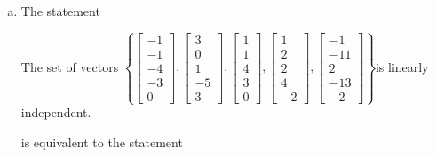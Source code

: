\begin{exerciseAnswer}
\begin{enumerate}[(a)]
\item The statement 
\begin{center}\begin{minipage}{0.8\textwidth}
 The set of vectors \( \left\{ \left[\begin{array}{c}
-1 \\
-1 \\
-4 \\
-3 \\
0
\end{array}\right] , \left[\begin{array}{c}
3 \\
0 \\
1 \\
-5 \\
3
\end{array}\right] , \left[\begin{array}{c}
1 \\
1 \\
4 \\
3 \\
0
\end{array}\right] , \left[\begin{array}{c}
1 \\
2 \\
2 \\
4 \\
-2
\end{array}\right] , \left[\begin{array}{c}
-1 \\
-11 \\
2 \\
-13 \\
-2
\end{array}\right] \right\} \)is linearly independent.
\end{minipage}\end{center}
     is equivalent to the statement 
\begin{center}\begin{minipage}{0.8\textwidth}
 The vector equation \( x_{1} \left[\begin{array}{c}
-1 \\
-1 \\
-4 \\
-3 \\
0
\end{array}\right] + x_{2} \left[\begin{array}{c}
3 \\
0 \\

\end{array}
\end{minipage}
\end{center}
\end{enumerate}
\end{exerciseAnswer}
